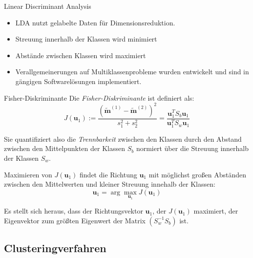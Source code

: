\begin{defi}{Linear Discriminant Analysis}
    \begin{itemize}
        \item LDA nutzt gelabelte Daten für Dimensionsreduktion.
        \item Streuung innerhalb der Klassen wird minimiert
        \item Abstände zwischen Klassen wird maximiert
        \item Verallgemeinerungen auf Multiklassenprobleme wurden entwickelt und sind in gängigen Softwarelösungen implementiert.
    \end{itemize}
\end{defi}

\begin{bonus}{Fisher-Diskriminante}
    Die \emph{Fisher-Diskriminante} ist definiert als:
    \[
        J(\mathbf{u}_1) := \frac{(\tilde{\mathbf{m}}^{(1)} - \tilde{\mathbf{m}}^{(2)})^2}{s_1^2 + s_2^2} = \frac{\mathbf{u}_1^T S_b \mathbf{u}_1}{\mathbf{u}_1^T S_w \mathbf{u}_1}
    \]

    Sie quantifiziert also die \emph{Trennbarkeit} zwischen den Klassen durch den Abstand zwischen den Mittelpunkten der Klassen $S_b$ normiert über die Streuung innerhalb der Klassen $S_w$.

    Maximieren von $J(\mathbf{u}_1)$ findet die Richtung $\mathbf{u}_1$ mit möglichst großen Abständen zwischen den Mittelwerten und kleiner Streuung innehalb der Klassen:
    \[
        \mathbf{u}_1 = \arg\max_{\mathbf{u}_1} J(\mathbf{u}_1)
    \]

    Es stellt sich heraus, dass der Richtungsvektor $\mathbf{u}_1$, der $J(\mathbf{u}_1)$ maximiert, der Eigenvektor zum größten Eigenwert der Matrix $(S_w^{-1}S_b)$ ist.
\end{bonus}

\subsection{Clusteringverfahren}

